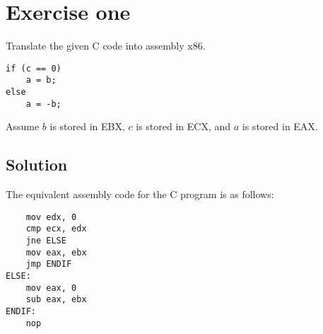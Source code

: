 \section{Exercise one}
Translate the given C code into assembly x86. 
\begin{verbatim}
if (c == 0)
    a = b;
else
    a = -b;
\end{verbatim}
Assume $b$ is stored in EBX, $c$ is stored in ECX, and $a$ is stored in EAX.

\subsection*{Solution}
The equivalent assembly code for the C program is as follows:
\begin{verbatim}
    mov edx, 0
    cmp ecx, edx
    jne ELSE
    mov eax, ebx
    jmp ENDIF
ELSE:
    mov eax, 0
    sub eax, ebx
ENDIF:
    nop
\end{verbatim}